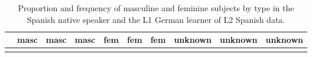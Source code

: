 \documentclass[
  letterpaper,
  DIV=11,
  numbers=noendperiod]{scrartcl}
\begin{document}
\begin{longtable}[]{@{}
  >{\raggedright\arraybackslash}p{}
  >{\raggedright\arraybackslash}p{}
  >{\raggedright\arraybackslash}p{}
  >{\raggedright\arraybackslash}p{}
  >{\raggedright\arraybackslash}p{}
  >{\raggedright\arraybackslash}p{}
  >{\raggedright\arraybackslash}p{}
  >{\raggedright\arraybackslash}p{}
  >{\raggedright\arraybackslash}p{}
  >{\raggedright\arraybackslash}p{}@{}}
\caption{Proportion and frequency of masculine and feminine subjects by
type in the Spanish native speaker and the L1 German learner of L2
Spanish data.}\label{tbl-genus}\tabularnewline
\toprule\noalign{}
\begin{minipage}[b]{\linewidth}\raggedright
\end{minipage} & \begin{minipage}[b]{\linewidth}\raggedright
masc
\end{minipage} & \begin{minipage}[b]{\linewidth}\raggedright
masc
\end{minipage} & \begin{minipage}[b]{\linewidth}\raggedright
masc
\end{minipage} & \begin{minipage}[b]{\linewidth}\raggedright
fem
\end{minipage} & \begin{minipage}[b]{\linewidth}\raggedright
fem
\end{minipage} & \begin{minipage}[b]{\linewidth}\raggedright
fem
\end{minipage} & \begin{minipage}[b]{\linewidth}\raggedright
unknown
\end{minipage} & \begin{minipage}[b]{\linewidth}\raggedright
unknown
\end{minipage} & \begin{minipage}[b]{\linewidth}\raggedright
unknown
\end{minipage} \\
\midrule\noalign{}
\endfirsthead
\toprule\noalign{}

\end{longtable}
\end{document}

